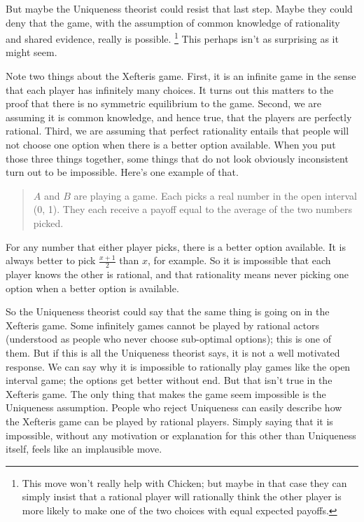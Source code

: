 \documentclass[
  11pt,
]{article}
\begin{document}
But maybe the Uniqueness theorist could resist that last step. Maybe they could deny that the game, with the assumption of common knowledge of rationality and shared evidence, really is possible. \footnote{This move won't really help with Chicken; but maybe in that case they can simply insist that a rational player will rationally think the other player is more likely to make one of the two choices with equal expected payoffs.} This perhaps isn't as surprising as it might seem.

Note two things about the Xefteris game. First, it is an infinite game in the sense that each player has infinitely many choices. It turns out this matters to the proof that there is no symmetric equilibrium to the game. Second, we are assuming it is common knowledge, and hence true, that the players are perfectly rational. Third, we are assuming that perfect rationality entails that people will not choose one option when there is a better option available. When you put those three things together, some things that do not look obviously inconsistent turn out to be impossible. Here's one example of that.

\begin{quote}
\(A\) and \(B\) are playing a game. Each picks a real number in the open interval (0, 1). They each receive a payoff equal to the average of the two numbers picked.
\end{quote}

For any number that either player picks, there is a better option available. It is always better to pick \(\frac{x+1}{2}\) than \(x\), for example. So it is impossible that each player knows the other is rational, and that rationality means never picking one option when a better option is available.

So the Uniqueness theorist could say that the same thing is going on in the Xefteris game. Some infinitely games cannot be played by rational actors (understood as people who never choose sub-optimal options); this is one of them. But if this is all the Uniqueness theorist says, it is not a well motivated response. We can say why it is impossible to rationally play games like the open interval game; the options get better without end. But that isn't true in the Xefteris game. The only thing that makes the game seem impossible is the Uniqueness assumption. People who reject Uniqueness can easily describe how the Xefteris game can be played by rational players. Simply saying that it is impossible, without any motivation or explanation for this other than Uniqueness itself, feels like an implausible move.
\end{document}
